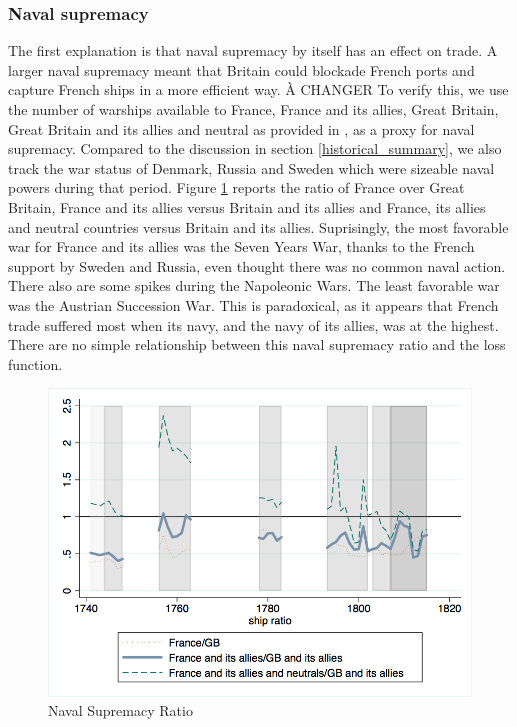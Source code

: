 \documentclass[12pt,a4paper,notitlepage,english]{article}
\begin{document}
\subsubsection{Naval supremacy}
The first explanation is that naval supremacy by itself has an effect on trade.
A larger naval supremacy meant that Britain could blockade French ports and capture French ships in a more efficient way.
À CHANGER
To verify this, we use the number of warships available to France, France and its allies, Great Britain, Great Britain and its allies and neutral as provided in \cite{Modelski1988}, as a proxy for naval supremacy.
Compared to the discussion in section \ref{historical_summary}, we also track the war status of Denmark, Russia and Sweden which were sizeable naval powers during that period.
Figure \ref{naval_supremacy_ratios} reports the ratio of France over Great Britain, France and its allies versus Britain and its allies and France, its allies and neutral countries versus Britain and its allies.
Suprisingly, the most favorable war for France and its allies was the Seven Years War, thanks to the French support by Sweden and Russia, even thought there was no common naval action.
There also are some spikes during the Napoleonic Wars.
The least favorable war was the Austrian Succession War. 
This is paradoxical, as it appears that French trade suffered most when its navy, and the navy of its allies, was at the highest.
There are no simple relationship between this naval supremacy ratio and the loss function. 
\begin{center}
\begin{figure}[H]
\caption{Naval Supremacy Ratio}
\label{naval_supremacy_ratios}
\centering
\includegraphics[scale=.51]{naval_supremacy_ratios.png}
\end{figure}
\end{center}
\end{document}

